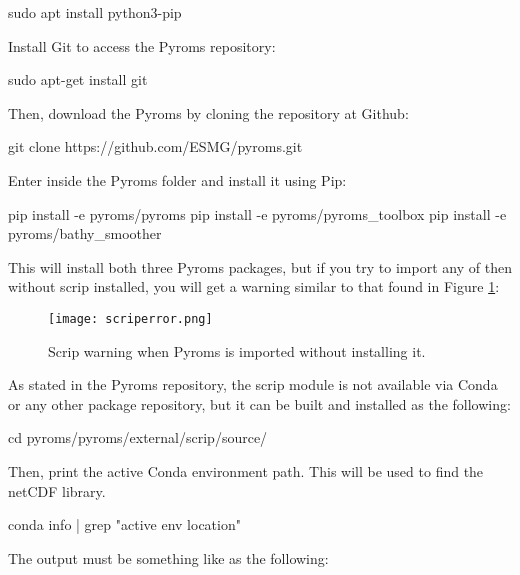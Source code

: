 \begin{bashcode}
sudo apt install python3-pip
\end{bashcode}
\bigskip

\noindent Install Git to access the Pyroms repository:\label{gitinfo}
\bigskip

\begin{bashcode}
sudo apt-get install git
\end{bashcode}
\bigskip

\noindent Then, download the Pyroms by cloning the repository at Github:
\bigskip

\begin{bashcode}
git clone https://github.com/ESMG/pyroms.git
\end{bashcode}
\bigskip

\noindent Enter inside the Pyroms folder and install it using Pip:
\bigskip

\begin{bashcode}
pip install -e pyroms/pyroms
pip install -e pyroms/pyroms_toolbox
pip install -e pyroms/bathy_smoother
\end{bashcode}
\bigskip

\noindent This will install both three Pyroms packages, but if you try to import any of then without scrip installed, you will get a warning 
similar to that found in \textcolor{bleu_cite}{Figure \ref{scriperror}}:
\bigskip

\begin{figure}[H]
  \centering
  \texttt{[image: scriperror.png]}
  \caption{Scrip warning when Pyroms is imported without installing it.}
  \label{scriperror}
\end{figure}
\bigskip

\noindent As stated in the Pyroms repository, the scrip module is not available via Conda or any other package repository, but it can be built 
and installed as the following:
\bigskip

\begin{bashcode}
cd pyroms/pyroms/external/scrip/source/
\end{bashcode}
\bigskip

\noindent Then, print the active Conda environment path. This will be used to find the netCDF library.
\bigskip

\begin{bashcode}
conda info | grep "active env location"
\end{bashcode}
\bigskip

\noindent The output must be something like as the following:
\bigskip

